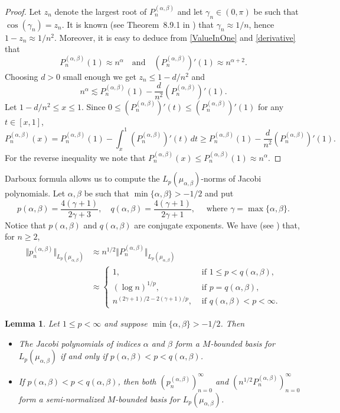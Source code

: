 \documentclass[11pt, leqno]{amsart}
\newtheorem{lemma}[theorem]{Lemma}
\theoremstyle{remark}
\numberwithin{equation}{section}
\begin{document}
\begin{proof}
Let  $z_n$ denote the largest root of $ P_n^{(\alpha,\beta)}$ and let $\gamma_n\in(0,\pi)$ be such that $\cos(\gamma_n)=z_n$.
It is known (see Theorem~8.9.1 in \cite{Szego}) that $\gamma_n\approx 1/n$, hence $1-z_n\approx 1/n^2$. 
Moreover, it is easy to deduce from \eqref{ValueInOne} and \eqref{derivative} that 
\[
P_n^{(\alpha,\beta)}(1)\approx n^\alpha \quad\text{and}\quad 
(P_n^{(\alpha,\beta)})'(1)\approx n^{\alpha+2}.
\] 
Choosing $d>0$ small enough we get
$z_n \le 1-d/n^2$ and
\[
n^\alpha\lesssim P_n^{(\alpha,\beta)}(1) - \frac{d}{n^2} (P_n^{(\alpha,\beta)})'(1).
\]
Let $1-d/n^2 \le x \le 1$. 
Since $0\le (P_n^{(\alpha,\beta)})'(t)\le (P_n^{(\alpha,\beta)})'(1)$ for any $t\in[x,1]$,
\[
P_n^{(\alpha,\beta)}(x)
= P_n^{(\alpha,\beta)}(1) - \int_x^1 (P_n^{(\alpha,\beta)})'(t)\, dt 
\ge P_n^{(\alpha,\beta)}(1) - \frac{d}{n^2} (P_n^{(\alpha,\beta)})'(1).
\]
For the reverse inequality we note that $P_n^{(\alpha,\beta)}(x)\le P_n^{(\alpha,\beta)}(1)\approx n^\alpha$.
\end{proof}




Darboux formula allows us to compute the $L_p(\mu_{\alpha,\beta})$-norms of Jacobi polynomials.
Let $\alpha,\beta$ be such that $\min\{\alpha,\beta\}> -1/2$ and put
\[
p(\alpha,\beta)=\frac{4(\gamma+1)}{2\gamma+3}, \quad
q(\alpha,\beta)=\frac{4(\gamma+1)}{2 \gamma +1}, \quad\text{ where }\gamma=\max\{\alpha,\beta\}.
\]
Notice that $p(\alpha,\beta)$ and $q(\alpha,\beta)$ are conjugate exponents.
 We have (see \cite{Leves-Kus}) that, for $n\ge 2$,
\begin{equation}
\label{result:JacobiBasisNorm}
\begin{aligned}
 \Vert p_n^{(\alpha,\beta)} \Vert_{L_p(\mu_{\alpha,\beta})}
&\approx n^{1/2}\Vert P_n^{(\alpha,\beta)} \Vert_{L_p(\mu_{\alpha,\beta})} \\
&\approx
 \begin{cases} 1, & \text{ if } 1\le p<q(\alpha,\beta), \\
 (\log n)^{1/p}, & \text{ if } p=q(\alpha,\beta),\\
 n^{(2 \gamma+1)/2-2( \gamma+1)/p}, & \text{ if } q(\alpha,\beta)<p<\infty.
\end{cases}
\end{aligned}
\end{equation}


\begin{lemma}
\label{result:NormalizationAndBoundedness} 
Let $1\le p< \infty$ and  suppose $\min\{\alpha, \beta\}>-1/2$.  Then
\begin{itemize}
\item[(a)] The Jacobi polynomials of indices $\alpha$ and $\beta$ form a $M$-bounded basis for $L_p(\mu_{\alpha,\beta})$ if and only if
$p(\alpha,\beta)<p<q(\alpha,\beta)$.
\item[(b)] If $p(\alpha,\beta)<p<q(\alpha,\beta)$, then both $(p_n^{(\alpha,\beta)})_{n=0}^\infty$ and $(n^{1/2} P_n^{(\alpha,\beta)})_{n=0}^\infty$
 form a semi-normalized $M$-bounded basis for $L_p(\mu_{\alpha,\beta})$.
\end{itemize}
\end{lemma}
\end{document}
